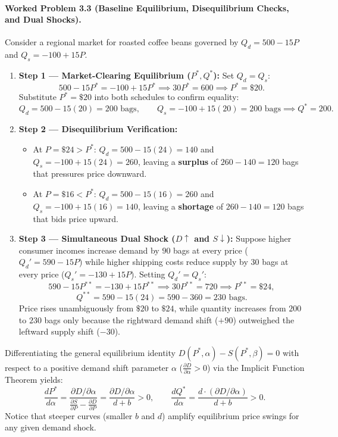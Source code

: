 \documentclass[11pt,letterpaper]{article}
\begin{document}
\paragraph{Worked Problem 3.3 (Baseline Equilibrium, Disequilibrium Checks, and Dual Shocks).}
Consider a regional market for roasted coffee beans governed by $Q_d = 500 - 15P$ and $Q_s = -100 + 15P$.
\begin{enumerate}
  \item \textbf{Step 1 — Market-Clearing Equilibrium ($P^*, Q^*$):} Set $Q_d = Q_s$:
  $$500 - 15P^* = -100 + 15P^* \implies 30P^* = 600 \implies P^* = \$20.$$
  Substitute $P^* = \$20$ into both schedules to confirm equality:
  $$Q_d = 500 - 15(20) = 200 \text{ bags}, \qquad Q_s = -100 + 15(20) = 200 \text{ bags} \implies Q^* = 200.$$
  \item \textbf{Step 2 — Disequilibrium Verification:}
  \begin{itemize}
    \item At $P = \$24 > P^*$: $Q_d = 500 - 15(24) = 140$ and $Q_s = -100 + 15(24) = 260$, leaving a \textbf{surplus} of $260 - 140 = 120$ bags that pressures price downward.
    \item At $P = \$16 < P^*$: $Q_d = 500 - 15(16) = 260$ and $Q_s = -100 + 15(16) = 140$, leaving a \textbf{shortage} of $260 - 140 = 120$ bags that bids price upward.
  \end{itemize}
  \item \textbf{Step 3 — Simultaneous Dual Shock ($D \uparrow$ and $S \downarrow$):} Suppose higher consumer incomes increase demand by $90$ bags at every price ($Q_d' = 590 - 15P$) while higher shipping costs reduce supply by $30$ bags at every price ($Q_s' = -130 + 15P$). Setting $Q_d' = Q_s'$:
  $$590 - 15P^{**} = -130 + 15P^{**} \implies 30P^{**} = 720 \implies P^{**} = \$24,$$
  $$Q^{**} = 590 - 15(24) = 590 - 360 = 230 \text{ bags}.$$
  Price rises unambiguously from $\$20$ to $\$24$, while quantity increases from $200$ to $230$ bags only because the rightward demand shift ($+90$) outweighed the leftward supply shift ($-30$).
\end{enumerate}

\begin{coreprinciple}
Differentiating the general equilibrium identity $D(P^*, \alpha) - S(P^*, \beta) = 0$ with respect to a positive demand shift parameter $\alpha$ ($\frac{\partial D}{\partial \alpha} > 0$) via the Implicit Function Theorem yields:
$$\frac{dP^*}{d\alpha} = \frac{\partial D / \partial \alpha}{\frac{\partial S}{\partial P} - \frac{\partial D}{\partial P}} = \frac{\partial D / \partial \alpha}{d + b} > 0, \qquad \frac{dQ^*}{d\alpha} = \frac{d \cdot (\partial D / \partial \alpha)}{d + b} > 0.$$
Notice that steeper curves (smaller $b$ and $d$) amplify equilibrium price swings for any given demand shock.
\end{coreprinciple}
\end{document}
